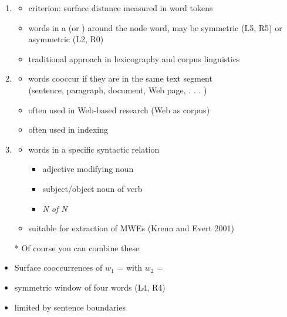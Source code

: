 \documentclass[a4paper,landscape,headrule,footrule,dvips]{foils}
\begin{document}
\begin{CJK}{UTF8}{min}
\begin{itemize}
\begin{itemize}
\end{itemize}
  \end{itemize}


\begin{enumerate}
\item  {}
  \begin{itemize}
  \item criterion: surface distance measured in word tokens
  \item words in a  (or ) around
    the node word, may be symmetric (L5, R5) or asymmetric (L2, R0)
  \item  traditional approach in lexicography and corpus linguistics
  \end{itemize}
\item {}
  \begin{itemize}
\item words cooccur if they are in the same text segment
\\ (sentence, paragraph, document, Web page, . . . )
\item often used in Web-based research (\into Web as corpus)
\item often used in indexing
\end{itemize}
\newpage
\item {}
  \begin{itemize}
  \item words in a specific syntactic relation
  \begin{itemize}
  \item adjective modifying noun
  \item subject/object noun of verb
  \item \textit{N of N} 
  \end{itemize}
\item suitable for extraction of MWEs (Krenn and Evert 2001)
\end{itemize}
\item[*] Of course you can combine these
\end{enumerate}


\begin{itemize}
  \item Surface cooccurrences of 
    $w_1$ =  with $w_2$ = 
  \item symmetric window of four words (L4, R4)
  \item  limited by sentence boundaries
  \end{itemize}
  

\end{CJK}
\end{document}
